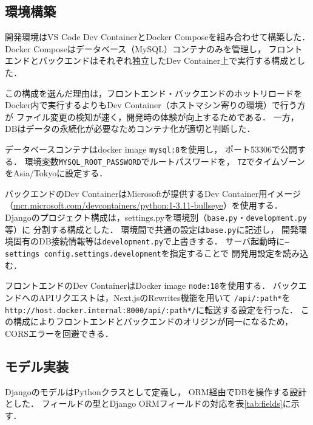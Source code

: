 \documentclass[submit,techrep]{ipsj}
\begin{document}
\subsection{環境構築}

開発環境はVS Code Dev Container\cite{devcontainer-vscode}とDocker Compose\cite{docker-compose-docs}を組み合わせて構築した．
Docker Composeはデータベース（MySQL）コンテナのみを管理し，
フロントエンドとバックエンドはそれぞれ独立したDev Container上で実行する構成とした．

この構成を選んだ理由は，フロントエンド・バックエンドのホットリロードを
Docker内で実行するよりもDev Container（ホストマシン寄りの環境）で行う方が
ファイル変更の検知が速く，開発時の体験が向上するためである．
一方，DBはデータの永続化が必要なためコンテナ化が適切と判断した．

データベースコンテナはdocker image \texttt{mysql:8}を使用し，
ポート53306で公開する．
環境変数\texttt{MYSQL\_ROOT\_PASSWORD}でルートパスワードを，
\texttt{TZ}でタイムゾーンをAsia/Tokyoに設定する．

バックエンドのDev ContainerはMicrosoftが提供するDev Container用イメージ
（\url{mcr.microsoft.com/devcontainers/python:1-3.11-bullseye}）を使用する．
Djangoのプロジェクト構成は，settings.pyを環境別（\texttt{base.py}・\texttt{development.py}等）に
分割する構成とした．
環境間で共通の設定は\texttt{base.py}に記述し，
開発環境固有のDB接続情報等は\texttt{development.py}で上書きする．
サーバ起動時に\texttt{--settings config.settings.development}を指定することで
開発用設定を読み込む．

フロントエンドのDev ContainerはDocker image \texttt{node:18}を使用する．
バックエンドへのAPIリクエストは，Next.jsのRewrites機能\cite{nextjs-rewrites}を用いて
\texttt{/api/:path*}を\texttt{http://host.docker.internal:8000/api/:path*/}に転送する設定を行った．
この構成によりフロントエンドとバックエンドのオリジンが同一になるため，
CORSエラーを回避できる．

\subsection{モデル実装}

DjangoのモデルはPythonクラスとして定義し，
ORM経由でDBを操作する設計とした\cite{django-docs}．
フィールドの型とDjango ORMフィールドの対応を表\ref{tab:fields}に示す．
\end{document}

